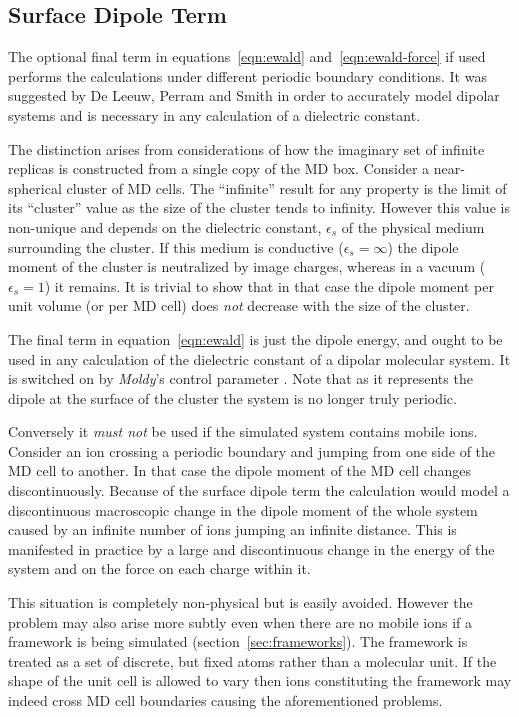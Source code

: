 \documentclass[a4paper,twoside]{report}
\newcommand{\moldy}{\emph{Moldy}}
\begin{document}
\subsection{Surface Dipole Term}
The optional final term in equations~\ref{eqn:ewald} 
and~\ref{eqn:ewald-force} if used performs the calculations under
different periodic boundary conditions.  It was suggested by De Leeuw,
Perram and Smith\cite{deleeuw:80} in order to accurately model
dipolar systems and is necessary in any calculation of a dielectric
constant. 

The distinction arises from considerations of how the imaginary set of
infinite replicas is constructed from a single copy of the MD 
box\cite[pp 156-159]{allen:87}.  Consider a near-spherical cluster
of MD cells.  The ``infinite'' result for any property is the limit of
its ``cluster'' value as the size of the cluster tends to infinity.
However this value is non-unique and depends on the dielectric
constant, $\epsilon_s$ of the physical medium surrounding the cluster.
If this medium is conductive ($\epsilon_s=\infty$) the dipole
moment of the cluster is neutralized by image charges, whereas in a
vacuum ($\epsilon_s=1$) it remains.  It is trivial to show that
in that case the dipole moment per unit volume (or per MD cell) does
\emph{not} decrease with the size of the cluster.

The final term in equation~\ref{eqn:ewald} is just the dipole energy,
and ought to be used in any calculation of the dielectric constant of
a dipolar molecular system.  It is switched on by \moldy's control
parameter .  Note that as it represents the
dipole at the surface of the cluster the system is no longer truly
periodic.

Conversely it \emph{must not} be used if the simulated system contains
mobile ions.  Consider an ion crossing a periodic boundary and jumping
from one side of the MD cell to another.  In that case the dipole
moment of the MD cell changes discontinuously.   Because of the
surface dipole term the calculation would model a discontinuous
macroscopic change in the dipole moment of the whole system caused by
an infinite number of ions jumping an infinite distance.  This is
manifested in practice by a large and discontinuous change in the
energy of the system and on the force on each charge within it.

This situation is completely non-physical but is easily avoided.
However the problem may also arise more subtly even when there are no
mobile ions if a framework is being simulated
(section~\ref{sec:frameworks}).  The framework is treated as a set of
discrete, but fixed atoms rather than a molecular unit.  If the shape
of the unit cell is allowed to vary then ions constituting the
framework may indeed cross MD cell boundaries causing the
aforementioned problems.
\end{document}
